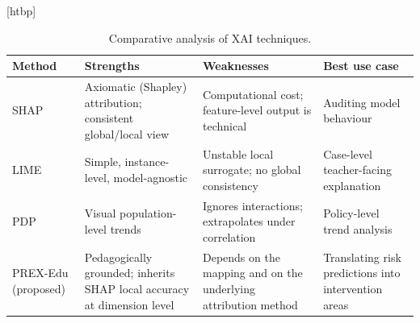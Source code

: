 \begin{table}
\small[htbp]
\caption{Comparative analysis of XAI techniques.}
\label{tab:T03_xai_techniques}
\begin{tabular}{llll}
\toprule
Method & Strengths & Weaknesses & Best use case \\
\midrule
SHAP & Axiomatic (Shapley) attribution; consistent global/local view & Computational cost; feature-level output is technical & Auditing model behaviour \\
LIME & Simple, instance-level, model-agnostic & Unstable local surrogate; no global consistency & Case-level teacher-facing explanation \\
PDP & Visual population-level trends & Ignores interactions; extrapolates under correlation & Policy-level trend analysis \\
PREX-Edu (proposed) & Pedagogically grounded; inherits SHAP local accuracy at dimension level & Depends on the mapping and on the underlying attribution method & Translating risk predictions into intervention areas \\
\bottomrule
\end{tabular}
\end{table}
